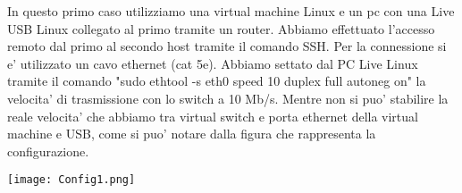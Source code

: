 \documentclass[../lab2.tex]{subfiles}
\begin{document}
    In questo primo caso utilizziamo una virtual machine Linux e un pc con una Live
    USB Linux collegato al primo tramite un router.
    Abbiamo effettuato l'accesso remoto dal primo al secondo host tramite il comando SSH. 
    Per la connessione si e' utilizzato un cavo ethernet (cat 5e).
    Abbiamo settato dal PC Live Linux tramite il comando "sudo ethtool -s eth0 speed 
    10 duplex full autoneg on" la velocita' di trasmissione con lo switch a 10 Mb/s.
    Mentre non si puo' stabilire la reale velocita' che abbiamo tra virtual switch
    e porta ethernet della virtual machine e USB, come si puo' notare dalla
    figura che rappresenta la configurazione.

    \begin{center}
        \texttt{[image: Config1.png]}
    \end{center}
\end{document}
